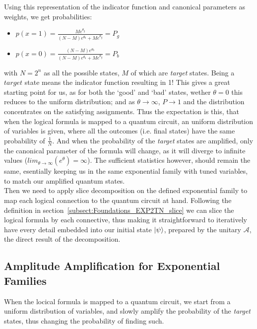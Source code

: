 \documentclass[encoding=utf8,british]{tumphthesis}
\begin{document}
            Using this representation of the indicator function and canonical parameters as weights, we get probabilities:
            \begin{itemize}
                \item $p(x = 1) = \frac{Me^{\theta_g}}{(N - M)e^{\theta_b} + Me^{\theta_g}} = P_g$ 
                \item $p(x = 0) = \frac{(N-M)e^{\theta_b}}{(N - M)e^{\theta_b} + Me^{\theta_g}} = P_b$
            \end{itemize}
            with $N = 2^n$ as all the possible states, $M$ of which are \textit{target} states. Being a $target$ state means the indicator function resulting in 1!
            This gives a great starting point for us, as for both the `good' and `bad' states, wether $\theta=0$ this reduces to the uniform distribution; and as $\theta \to \infty$, $P \to 1$
            and the distribution concentrates on the satisfying assignments. Thus the expectation is this, that when the logical formula is mapped
            to a quantum circuit, an uniform distribution of variables is given, where all the outcomes (i.e. final states) have the same probability of $\frac{1}{N}$. 
            And when the probability of the \textit{target} states are amplified, only the canonical parameter of the formula will change, as it will diverge to infinite 
            values ($lim_{\theta \rightarrow \infty}(e^{\theta}) = \infty$). The sufficient statistics however, should remain
            the same, esentially keeping us in the same exponential family with tuned variables, to match our amplified quantum states.
            \\
            Then we need to apply slice decomposition on the defined exponential family to map each logical connection to the quantum circuit at hand.
            Following the definition in section~\ref{subsect:Foundations_EXP2TN_slice} we can slice the logical formula by each connective, thus making it straightforward
            to iteratively have every detail embedded into our initial state $\left|\psi\right>$, prepared by the unitary $\mathcal{A}$, the direct result of the decomposition.

        \subsection{Amplitude Amplification for Exponential Families}
        When the locical formula is mapped to a quantum circuit, we start from a uniform distribution of variables, and slowly amplify 
        the probability of the \textit{target} states, thus changing the probability of finding such.
\end{document}

